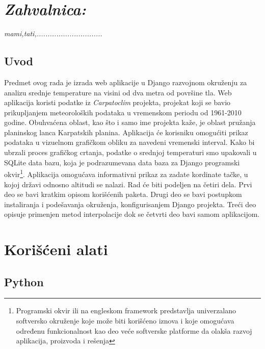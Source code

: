 \documentclass[12pt]{article}
\begin{document}
\section*{\textsl{Zahvalnica:}}
\textsl{mami,tati,..............................}
\newpage
\begin{center}
\section*{Uvod}
\end{center}
Predmet ovog rada je izrada web aplikacije u Django razvojnom okruženju za analizu srednje temperature na visini od dva metra od površine tla. Web aplikacija koristi podatke iz \textit{Carpatoclim} projekta, projekat koji se bavio prikupljanjem meteoroloških podataka u vremenskom periodu od 1961-2010 godine. Obuhvaćena oblast, kao što i samo ime projekta kaže, je oblast  pružanja planinskog lanca Karpatskih planina. Aplikacija će korisniku omogućiti prikaz podataka u vizuelnom grafičkom obliku za navedeni vremenski interval. Kako bi ubrzali proces grafičkog crtanja, podatke o srednjoj temperaturi smo upakovali u SQLite data bazu, koja je podrazumevana data baza za Django programski okvir\footnote{Programski okvir ili na engleskom framework predstavlja univerzalano softversko okruženje koje može biti korišćeno iznova i koje omogućava određenu funkcionalnost kao deo veće softverske platforme da olakša razvoj aplikacija, proizvoda i rešenja}. Aplikacija omogućava informativni prikaz za zadate kordinate tačke, u kojoj državi odnosno altitudi se nalazi. 
Rad će biti podeljen na četiri dela. Prvi deo se bavi kratkim opisom korišćenih paketa. Drugi deo se bavi postupkom instaliranja i podešavanja okruženja, konfigurisanjem Django projekta. Treći deo opisuje primenjen metod interpolacije dok se četvrti deo bavi samom aplikacijom. 
\newpage

\section{Korišćeni alati}

\subsection{Python} 
\end{document}
